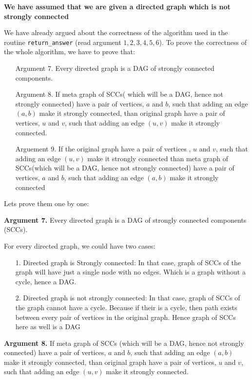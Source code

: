 \documentclass[answers]{exam}
\begin{document}
\begin{questions}
\begin{solution}
\textbf{ We have assumed that we are given a directed graph which is not strongly connected}\par
We have already argued about the correctness of the algorithm used in the routine {\tt return\_answer} (read argument $1,2,3,4,5,6$). To prove the correctness of the whole algorithm, we have to prove that:
\begin{enumerate}
    \item [Argument 7.] Every directed graph is a DAG of strongly connected components.
    \item [Argument 8.] If meta graph of SCCs( which will be a DAG, hence not strongly connected) have a pair of vertices, $a$ and $b$, such that adding an edge $(a,b)$ make it strongly connected, than original graph have a pair of vertices, $u$ and $v$, such that adding an edge $(u,v)$ make it strongly connected.
    \item[Arguement 9.] If the original graph have a pair of vertices , $u$ and $v$, such that adding an edge $(u,v)$ make it strongly connected than meta graph of SCCs(which will be a DAG, hence not strongly connected) have a pair of vertices, $a$ and $b$, such that adding an edge $(a,b)$ make it strongly connected
    
    
\end{enumerate}

Lets prove them one by one:\par

\textbf{Argument 7.} Every directed graph is a DAG of strongly connected components (SCCs).



 For every directed graph, we could have two cases: \par

\begin{enumerate}
    \item [1. ] Directed graph is Strongly connected: In that case, graph of SCCs of the graph will have just a single node with no edges. Which is a graph without a cycle, hence a DAG.
    \item [2.] Directed graph is not strongly connected: In that case, graph of SCCs of the graph cannot have a cycle. Because if their is a cycle, then path exists between every pair of vertices in the 
 original graph. Hence graph of SCCs here as well is a DAG
\end{enumerate}  


\textbf{Argument 8.} If meta graph of SCCs (which will be a DAG, hence not strongly connected) have a pair of vertices, $a$ and $b$, such that adding an edge $(a,b)$ make it strongly connected, than original graph have a pair of vertices, $u$ and $v$, such that adding an edge $(u,v)$ make it strongly connected.


\end{solution}
\end{questions}
\end{document}
